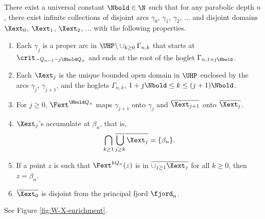 \documentclass{amsart}
\begin{document}
\begin{lemma}
    \label{lem:Wj's}
    There exist a universal constant $\Nbold  \in \N$ such that for any parabolic depth $n$, there exist infinite collections of disjoint arcs $\gamma_0$, $\gamma_1$, $\gamma_2$, $\ldots$ and disjoint domains $\Xext_0$, $\Xext_1$, $\Xext_2$, $\ldots$ with the following properties.
    \begin{enumerate}[label=\textnormal{(\alph*)}]
        \item Each $\gamma_j$ is a proper arc in $\UHP \backslash \cup_{k\geq 0} \Gamma_{n,k}$ that starts at $\crit_{-Q_{n-1}-j\Nbold Q_n}$ and ends at the root of the hoglet $\Gamma_{n,1+j\Nbold }$.
        \item Each $\Xext_j$ is the unique bounded open domain in $\UHP$ enclosed by the arcs $\gamma_j$, $\gamma_{j+1}$, and the hoglets $\Gamma_{n,k}$, $1+j \Nbold  \leq k \leq (j+1)\Nbold $.
        \item For $j \geq 0$, $\Fext^{\Nbold  Q_n}$ maps $\gamma_{j+1}$ onto $\gamma_j$ and $\overline{\Xext_{j+1}}$ onto $\overline{\Xext_{j}}$.
        \item $\Xext_j$'s accumulate at $\beta_n$, that is,
        \[
            \bigcap_{k \geq 1} \overline{\bigcup_{j \geq k} \Xext_j} = \{\beta_n\}.
        \]
        \item If a point $z$ is such that $\Fext^{k Q_n}(z)$ is in $\overline{\cup_{j \geq 1} \Xext_j}$ for all $k \geq 0$, then $z = \beta_n$.
        \item $\overline{\Xext_0}$ is disjoint from the principal fjord $\fjord_n$.
    \end{enumerate}
\end{lemma}

    See Figure \ref{fig:W-X-enrichment}.
\end{document}

